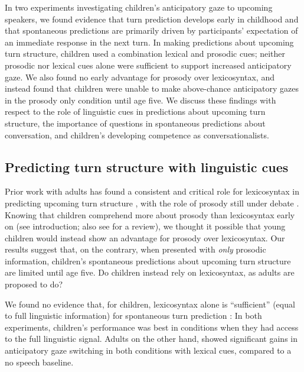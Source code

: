 \documentclass[authoryear, 12pt]{elsarticle}
\begin{document}
In two experiments investigating children's anticipatory gaze to upcoming speakers, we found evidence that turn prediction develops early in childhood and that spontaneous predictions are primarily driven by participants' expectation of an immediate response in the next turn. In making predictions about upcoming turn structure, children used a combination lexical and prosodic cues; neither prosodic nor lexical cues alone were sufficient to support increased anticipatory gaze. We also found no early advantage for prosody over lexicosyntax, and instead found that children were unable to make above-chance anticipatory gazes in the prosody only condition until age five. We discuss these findings with respect to the role of linguistic cues in predictions about upcoming turn structure, the importance of questions in spontaneous predictions about conversation, and children's developing competence as conversationalists.

\subsection{Predicting turn structure with linguistic cues}

Prior work with adults has found a consistent and critical role for lexicosyntax in predicting upcoming turn structure \citep{de-ruiter2006, magyari2012}, with the role of prosody still under debate \citep{duncan1972, ford1996, torreira2015}. Knowing that children comprehend more about prosody than lexicosyntax early on (see introduction; also see \citealp{speer2009} for a review), we thought it possible that young children would instead show an advantage for prosody over lexicosyntax. Our results suggest that, on the contrary, when presented with \textit{only} prosodic information, children's spontaneous predictions about upcoming turn structure are limited until age five. Do children instead rely on lexicosyntax, as adults are proposed to do?

We found no evidence that, for children, lexicosyntax alone is ``sufficient'' (equal to full linguistic information) for spontaneous turn prediction \citep[pg. 531]{de-ruiter2006}: In both experiments, children's performance was best in conditions when they had access to the full linguistic signal. Adults on the other hand, showed significant gains in anticipatory gaze switching in both conditions with lexical cues, compared to a no speech baseline. 
\end{document}
